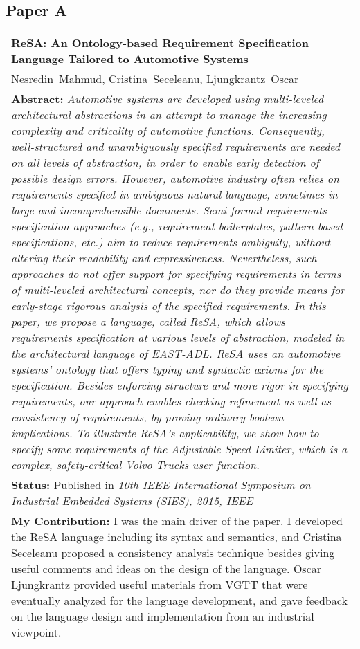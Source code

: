 \subsection{Paper A}
\begin{tabular}{p{\textwidth}}
\textbf{ReSA: An Ontology-based Requirement Specification Language Tailored to Automotive Systems} \\
Nesredin~Mahmud, Cristina~Seceleanu, Ljungkrantz~Oscar\\[6pt]
\textbf{Abstract:} \textit{Automotive systems are developed using multi-leveled architectural abstractions in an attempt to manage the increasing complexity and criticality of automotive functions. Consequently, well-structured and unambiguously specified requirements are needed on all levels of abstraction, in order to enable early detection of possible design errors. However, automotive industry often relies on requirements specified in ambiguous natural language, sometimes in large and incomprehensible documents. Semi-formal requirements specification approaches (e.g., requirement boilerplates, pattern-based specifications, etc.) aim to reduce requirements ambiguity, without altering their readability and expressiveness. Nevertheless, such approaches do not offer support for specifying requirements in terms of multi-leveled architectural concepts, nor do they provide means for early-stage rigorous analysis of the specified requirements. In this paper, we propose a language, called ReSA, which allows requirements specification at various levels of abstraction, modeled in the architectural language of EAST-ADL. ReSA uses an automotive systems' ontology that offers typing and syntactic axioms for the specification. Besides enforcing structure and more rigor in specifying requirements, our approach enables checking refinement as well as consistency of requirements, by proving ordinary boolean implications. To illustrate ReSA's applicability, we show how to specify some requirements of the Adjustable Speed Limiter, which is a complex, safety-critical Volvo Trucks user function.}\\[6pt]
\textbf{Status:} Published in \textit{10th IEEE International Symposium on Industrial Embedded Systems (SIES), 2015, IEEE}\\
\textbf{My Contribution: }I was the main driver of the paper. I developed the ReSA language including its syntax and semantics, and Cristina Seceleanu proposed a consistency analysis technique besides giving useful comments and ideas on the design of the language. Oscar Ljungkrantz provided useful materials from VGTT that were eventually analyzed for the language development, and gave feedback on the language design and implementation from an industrial viewpoint.
\end{tabular}

